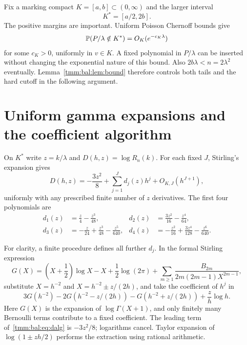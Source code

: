 \documentclass[11pt,letterpaper]{article}
\theoremstyle{remark}\newtheorem{remark}[theorem]{Remark}
\begin{document}
Fix a marking compact $K=[a,b]\subset(0,\infty)$ and the larger interval
\begin{equation}\label{tmm:bal:eq:compact}
 K^*=[a/2,2b].
\end{equation}
The positive margins are important. Uniform Poisson Chernoff bounds give
\begin{equation}\label{tmm:bal:eq:tail}
 \mathbb P(P/\lambda\notin K^*)=O_K(e^{-c_K\lambda})
\end{equation}
for some $c_K>0$, uniformly in $v\in K$. A fixed polynomial in $P/\lambda$ can be inserted without changing the exponential nature of this bound. Also $2b\lambda<n=2\lambda^2$ eventually. Lemma~\ref{tmm:bal:lem:bound} therefore controls both tails and the hard cutoff in the following argument.

\section{Uniform gamma expansions and the coefficient algorithm}\label{tmm:bal:sec:gamma}
On $K^*$ write $z=k/\lambda$ and $D(h,z)=\log R_n(k)$. For each fixed $J$, Stirling's expansion gives
\begin{equation}\label{tmm:bal:eq:D}
 D(h,z)=-\frac{3z^2}{8}+\sum_{j=1}^Jd_j(z)h^j+O_{K,J}(h^{J+1}),
\end{equation}
uniformly with any prescribed finite number of $z$ derivatives. The first four polynomials are
\begin{align}
 d_1(z)&=\frac z4-\frac{z^3}{48},&
 d_2(z)&=\frac{3z^2}{16}-\frac{z^4}{64},\label{tmm:bal:eq:d12}\\
 d_3(z)&=-\frac z{24}+\frac{z^3}{48}-\frac{z^5}{640},&
 d_4(z)&=-\frac{z^2}{16}+\frac{3z^4}{128}-\frac{z^6}{640}.\label{tmm:bal:eq:d34}
\end{align}

For clarity, a finite procedure defines all further $d_j$. In the formal Stirling expression
\begin{equation}\label{tmm:bal:eq:stirlingalg}
 G(X)=\left(X+\frac12\right)\log X-X+\frac12\log(2\pi)
 +\sum_{m\ge1}\frac{B_{2m}}{2m(2m-1)X^{2m-1}},
\end{equation}
substitute $X=h^{-2}$ and $X=h^{-2}\pm z/(2h)$, and take the coefficient of $h^j$ in
\begin{equation}\label{tmm:bal:eq:dalg}
 3G(h^{-2})-2G(h^{-2}-z/(2h))-G(h^{-2}+z/(2h))
             +\frac zh\log h.
\end{equation}
Here $G(X)$ is the expansion of $\log\Gamma(X+1)$, and only finitely many Bernoulli terms contribute to a fixed coefficient. The leading term of~\eqref{tmm:bal:eq:dalg} is $-3z^2/8$; logarithms cancel. Taylor expansion of $\log(1\pm zh/2)$ performs the extraction using rational arithmetic.
\end{document}
